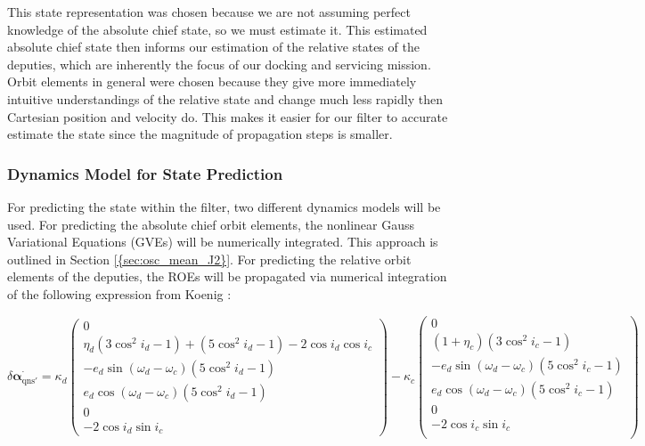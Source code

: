 This state representation was chosen because we are not assuming perfect knowledge of the absolute chief state, so we must estimate it. This estimated absolute chief state then informs our estimation of the relative states of the deputies, which are inherently the focus of our docking and servicing mission. Orbit elements in general were chosen because they give more immediately intuitive understandings of the relative state and change much less rapidly then Cartesian position and velocity do. This makes it easier for our filter to accurate estimate the state since the magnitude of propagation steps is smaller. 

\subsubsection{Dynamics Model for State Prediction}
For predicting the state within the filter, two different dynamics models will be used. For predicting the absolute chief orbit elements, the nonlinear Gauss Variational Equations (GVEs) will be numerically integrated. This approach is outlined in Section \ref{{sec:osc_mean_J2}}. For predicting the relative orbit elements of the deputies, the ROEs will be propagated via numerical integration of the following expression from Koenig \cite{koenig2017new}:

\begin{equation}
\delta \dot{\boldsymbol{\alpha}_{\text{qns}'}} = 
\kappa_d
\begin{pmatrix}
0 \\
\eta_d(3\cos^2 i_d - 1) + (5\cos^2 i_d - 1) - 2\cos i_d \cos i_c \\
- e_d \sin(\omega_d - \omega_c)(5\cos^2 i_d - 1) \\
e_d \cos(\omega_d - \omega_c)(5\cos^2 i_d - 1) \\
0 \\
-2\cos i_d \sin i_c
\end{pmatrix}
-
\kappa_c
\begin{pmatrix}
0 \\
(1 + \eta_c)(3\cos^2 i_c - 1) \\
- e_d \sin(\omega_d - \omega_c)(5\cos^2 i_c - 1) \\
e_d \cos(\omega_d - \omega_c)(5\cos^2 i_c - 1) \\
0 \\
-2\cos i_c \sin i_c \\
\end{pmatrix}
\tag{23}
\end{equation}

